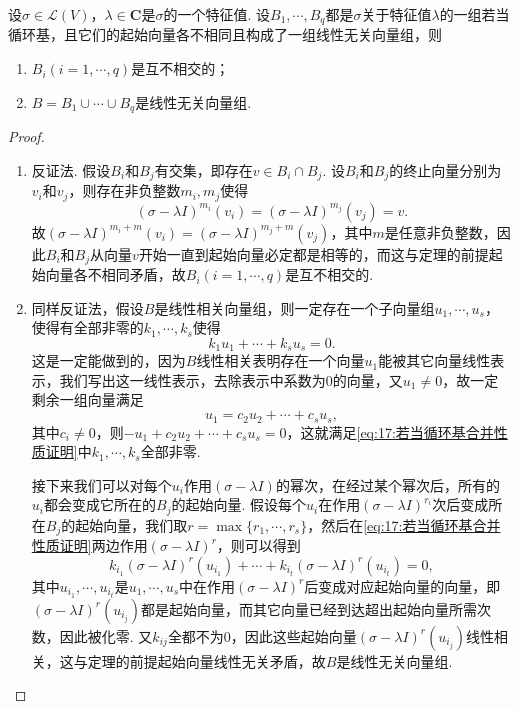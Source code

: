 \begin{lemma} \label{lem:17:若当循环基合并性质}
    设$\sigma\in\mathcal{L}(V)$，$\lambda\in\mathbf{C}$是$\sigma$的一个特征值. 设$B_1,\cdots,B_q$都是$\sigma$关于特征值$\lambda$的一组若当循环基，且它们的起始向量各不相同且构成了一组线性无关向量组，则
    \begin{enumerate}
        \item $B_i(i=1,\cdots,q)$是互不相交的；
        \item $B=B_1\cup\cdots\cup B_q$是线性无关向量组.
    \end{enumerate}
\end{lemma}
\begin{proof}
    \begin{enumerate}
        \item 反证法. 假设$B_i$和$B_j$有交集，即存在$v\in B_i\cap B_j$. 设$B_i$和$B_j$的终止向量分别为$v_i$和$v_j$，则存在非负整数$m_i,m_j$使得
        \[(\sigma-\lambda I)^{m_i}(v_i)=(\sigma-\lambda I)^{m_j}(v_j)=v.\]
        故$(\sigma-\lambda I)^{m_i+m}(v_i)=(\sigma-\lambda I)^{m_j+m}(v_j)$，其中$m$是任意非负整数，因此$B_i$和$B_j$从向量$v$开始一直到起始向量必定都是相等的，而这与定理的前提起始向量各不相同矛盾，故$B_i(i=1,\cdots,q)$是互不相交的.

        \item 同样反证法，假设$B$是线性相关向量组，则一定存在一个子向量组$u_1,\cdots,u_s$，使得有全部非零的$k_1,\cdots,k_s$使得
        \begin{equation} \label{eq:17:若当循环基合并性质证明}
            k_1u_1+\cdots+k_su_s=0.
        \end{equation}
        这是一定能做到的，因为$B$线性相关表明存在一个向量$u_1$能被其它向量线性表示，我们写出这一线性表示，去除表示中系数为0的向量，又$u_1\neq 0$，故一定剩余一组向量满足
        \[u_1=c_2u_2+\cdots+c_su_s,\]
        其中$c_i\neq 0$，则$-u_1+c_2u_2+\cdots+c_su_s=0$，这就满足\autoref{eq:17:若当循环基合并性质证明}中$k_1,\cdots,k_s$全部非零.

        接下来我们可以对每个$u_i$作用$(\sigma-\lambda I)$的幂次，在经过某个幂次后，所有的$u_i$都会变成它所在的$B_j$的起始向量. 假设每个$u_i$在作用$(\sigma-\lambda I)^{r_i}$次后变成所在$B_j$的起始向量，我们取$r=\max\{r_1,\cdots,r_s\}$，然后在\autoref{eq:17:若当循环基合并性质证明}两边作用$(\sigma-\lambda I)^r$，则可以得到
        \begin{equation}
            k_{i_1}(\sigma-\lambda I)^r(u_{i_1})+\cdots+k_{i_t}(\sigma-\lambda I)^r(u_{i_t})=0,
        \end{equation}
        其中$u_{i_1},\cdots,u_{i_t}$是$u_1,\cdots,u_s$中在作用$(\sigma-\lambda I)^r$后变成对应起始向量的向量，即$(\sigma-\lambda I)^r(u_{i_j})$都是起始向量，而其它向量已经到达超出起始向量所需次数，因此被化零. 又$k_{ij}$全都不为0，因此这些起始向量$(\sigma-\lambda I)^r(u_{i_j})$线性相关，这与定理的前提起始向量线性无关矛盾，故$B$是线性无关向量组.
    \end{enumerate}
\end{proof}

